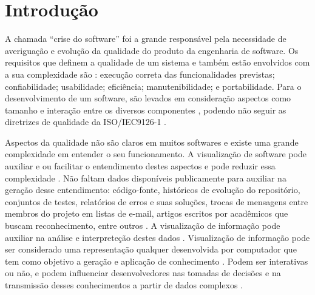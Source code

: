 \chapter{Introdução}


A chamada ``crise do software'' \cite{arthur1985measuring} foi a grande
responsável pela necessidade de averiguação e evolução da qualidade do produto
da engenharia de software. Os requisitos que definem a qualidade de um sistema
e também estão envolvidos com a sua complexidade são
\cite{behkamal2009customizing}: execução correta das funcionalidades previstas;
confiabilidade; usabilidade; eficiência; manutenibilidade; e portabilidade. Para
o desenvolvimento de um software, são levados em consideração aspectos como
tamanho e interação entre os diversos componentes \cite{koscianski2007qualidade},
podendo não seguir as diretrizes de qualidade da ISO/IEC9126-1 \cite{iso9126}.

Aspectos da qualidade não são claros em muitos softwares e existe
uma grande complexidade em entender o seu funcionamento. A visualização de
software pode auxiliar e ou facilitar o entendimento destes aspectos e pode
reduzir essa complexidade \cite{messias2012} \cite{benkler2006wealth}. Não
faltam dados disponíveis publicamente para auxiliar na geração desse
entendimento: código-fonte, históricos de evolução do repositório, conjuntos de
testes, relatórios de erros e suas soluções, trocas de mensagens entre membros
do projeto em listas de e-mail, artigos escritos por acadêmicos que buscam
reconhecimento, entre outros \cite{messias2012} \cite{benkler2006wealth}. A
visualização de informação pode auxiliar na análise e interpreteção destes dados
\cite{messias2012}. Visualização de informação pode ser considerado uma
representação qualquer desenvolvida por computador que tem como objetivo a
geração e aplicação de conhecimento \cite{card1999readings}. Podem ser
interativas ou não, e podem influenciar desenvolvedores nas tomadas de decisões
e na transmissão desses conhecimentos a partir de dados complexos
\cite{card1999readings}.

